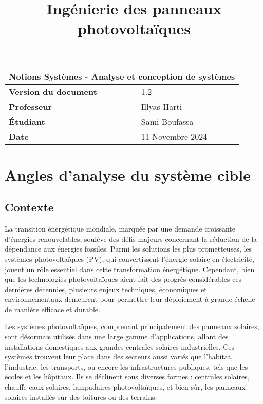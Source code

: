\documentclass{article}
\title{Ingénierie des panneaux photovoltaïques}
\author{}
\date{\vspace{-5ex}}
\begin{document}
\maketitle

\begin{center}
    \begin{tabular}{|l|l|}
        \hline
        \multicolumn{2}{|c|}{\textbf{Notions Systèmes - Analyse et conception de systèmes}} \\
        \hline
        \textbf{Version du document} & 1.2 \\
        \hline
        \textbf{Professeur} & Illyas Harti\\
        \hline
        \textbf{Étudiant} & Sami Boufassa\\
                            
        \hline
        \textbf{Date} & 11 Novembre 2024 \\
        \hline
    \end{tabular}
\end{center}

\tableofcontents

\newpage

\section{Angles d'analyse du système cible}
\subsection{Contexte}
La transition énergétique mondiale, marquée par une demande croissante d'énergies renouvelables, soulève des défis majeurs concernant la réduction de la dépendance aux énergies fossiles. Parmi les solutions les plus prometteuses, les systèmes photovoltaïques (PV), qui convertissent l'énergie solaire en électricité, jouent un rôle essentiel dans cette transformation énergétique. Cependant, bien que les technologies photovoltaïques aient fait des progrès considérables ces dernières décennies, plusieurs enjeux techniques, économiques et environnementaux demeurent pour permettre leur déploiement à grande échelle de manière efficace et durable.

Les systèmes photovoltaïques, comprenant principalement des panneaux solaires, sont désormais utilisés dans une large gamme d'applications, allant des installations domestiques aux grandes centrales solaires industrielles. Ces systèmes trouvent leur place dans des secteurs aussi variés que l'habitat, l'industrie, les transports, ou encore les infrastructures publiques, tels que les écoles et les hôpitaux. Ils se déclinent sous diverses formes : centrales solaires, chauffe-eaux solaires, lampadaires photovoltaïques, et bien sûr, les panneaux solaires installés sur des toitures ou des terrains.
\end{document}
